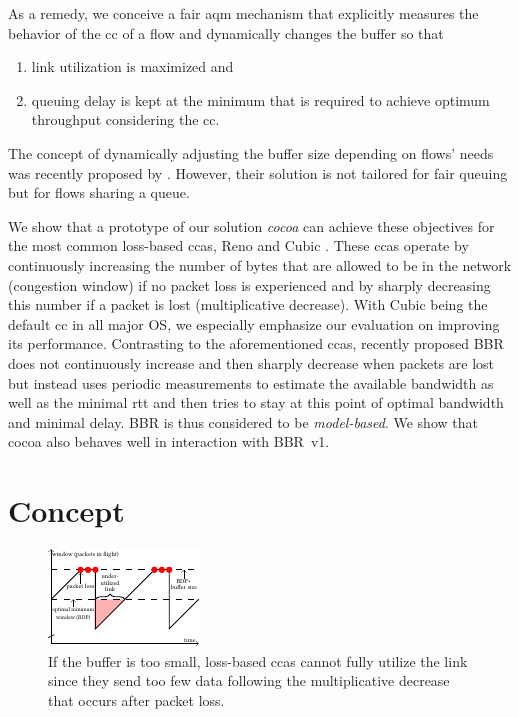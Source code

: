 \documentclass[10pt,sigconf,letterpaper,dvipsnames\ifx\removeHeaders\tempYes ,nonacm\fi]{acmart}
\begin{document}
As a remedy, we conceive a fair \gls{aqm} mechanism that explicitly measures the behavior of the \gls{cc} of a flow and dynamically changes the buffer so that 
\begin{enumerate}[topsep=0pt,wide,labelwidth=!,labelindent=0pt]
\item link utilization is maximized and
\item queuing delay is kept at the minimum that is required to achieve optimum throughput considering the \gls{cc}.
\end{enumerate}
The concept of dynamically adjusting the buffer size depending on flows' needs was recently proposed by \cite{bless_policy-oriented_2018}. However, their solution is not tailored for fair queuing but for flows sharing a queue. 

We show that a prototype of our solution \textit{\gls{cocoa}} can achieve these objectives for the most common loss-based \glspl{cca}, Reno \cite {jacobson_congestion_1988} and Cubic \cite{ha_cubic:_2008}. These \glspl{cca} operate by continuously increasing the number of bytes that are allowed to be in the network (congestion window) if no packet loss is experienced and by sharply decreasing this number if a packet is lost (multiplicative decrease). With Cubic being the default \gls{cc} in all major OS, we especially emphasize our evaluation on improving its performance. Contrasting to the aforementioned \glspl{cca}, recently proposed BBR \cite{cardwell_bbr:_2016} does not continuously increase and then sharply decrease when packets are lost but instead uses periodic measurements to estimate the available bandwidth as well as the minimal \gls{rtt} and then tries to stay at this point of optimal bandwidth and minimal delay. BBR is thus considered to be \textit{model-based}. We show that \gls{cocoa} also behaves well in interaction with BBR~v1.

\section{Concept}

\begin{figure}[h]
\includegraphics[width=\columnwidth]{figures/cocoa_illustration_too_little.pdf}
\caption{If the buffer is too small, loss-based \glspl{cca} cannot fully utilize the link since they send too few data following the multiplicative decrease that occurs after packet loss.}
\label{fig:tooLittle}
\end{figure}
\end{document}
